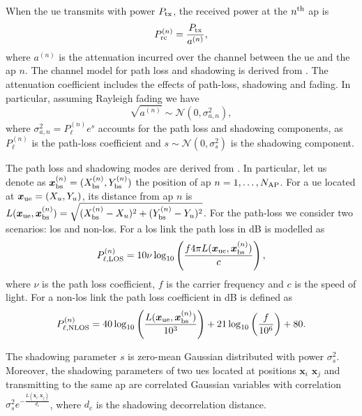 \documentclass[draftcls,onecolumn,12pt]{IEEEtran}
\begin{document}
When the \ac{ue} transmits with power $P_{\rm tx}$, the received power at the $n^{\rm th}$ \ac{ap} is
\begin{equation}\label{eq: rec pow}
    P_{\rm rc}^{(n)}= \frac{P_{\rm tx}}{a^{(n)}},
\end{equation}
where $a^{(n)}$ is the attenuation incurred over the channel between the \ac{ue} and the \ac{ap} $n$. The channel model for path loss and shadowing is derived from \cite{3gpp}. The attenuation coefficient includes the effects of path-loss, shadowing and fading. In particular, assuming Rayleigh fading we have 
\begin{equation}
    \sqrt{a^{(n)}} \sim \mathcal{N}\left(0,\sigma_{a,n}^2\right),
\end{equation}
where $\sigma_{a,n}^2={P_{\ell}^{(n)}}e^{s}$ accounts for the path loss and shadowing components, as $P_{\ell}^{(n)}$ is the path-loss coefficient and $s \sim \mathcal{N}(0,\sigma_s^2)$ is the shadowing component.

The  path loss and shadowing modes are  derived from \cite{3gpp}. In particular, let us denote as $\bm{x}_{\rm bs}^{(n)} =(X_{\rm bs}^{(n)},Y_{\rm bs}^{(n)})$ the position of  \ac{ap} $n= 1, \ldots, N_{\rm AP}$. For a \ac{ue} located at $\bm{x}_{\rm ue}=(X_u,Y_u)$, its distance from \ac{ap} $n$ is $L(\bm{x}_{\rm ue},\bm{x}_{\rm bs}^{(n)}) = \sqrt{(X_{\rm bs}^{(n)}-X_u)^2+(Y_{\rm bs}^{(n)}-Y_u)^2}$. For the path-loss we consider two scenarios: \ac{los} and non-\ac{los}. For a \ac{los} link the path loss in dB is modelled as
\begin{equation}\label{eq:los}
    P_{\ell,{\rm LOS}}^{(n)} = 10 \nu \log_{10}\left(\frac{f 4\pi L(\bm{x}_{\rm ue},\bm{x}_{\rm bs}^{(n)})}{c}\right),
\end{equation}
where $\nu$ is the path loss coefficient, $f$ is the carrier frequency and $c$ is the speed of light. 
For a  non-\ac{los} link the path loss coefficient in dB is defined as
\begin{equation}
    P_{\ell, {\rm NLOS}}^{(n)} = 40\log_{10}\left (\frac{L(\bm{x}_{\rm ue},\bm{x}_{\rm bs}^{(n)})}{10^3}\right ) + 21\log_{10}\left(\frac{f}{10^6}\right) + 80.
\end{equation}

The shadowing parameter $s$ is zero-mean Gaussian distributed with power $\sigma^2_s$. Moreover, the shadowing parameters of two \acp{ue} located at positions $\bm{x}_i$ $\bm{x}_j$ and transmitting to the same \ac{ap} are correlated Gaussian variables with correlation $\sigma_s^2e^{-\frac{L(\bm{x}_i,\bm{x}_j)}{d_c}}$, where $d_c$ is the shadowing decorrelation distance. 
\end{document}
